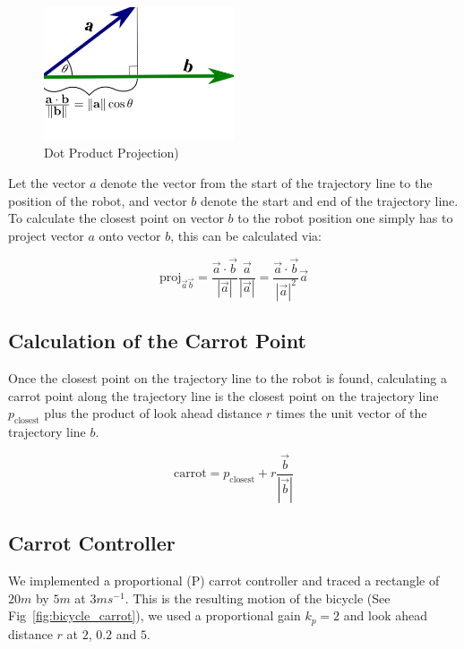 \documentclass{article}
\begin{document}
\begin{figure}[H]
	\centering
	\includegraphics[width=0.5\textwidth]{images/dot_product_projection.png}
	\caption{Dot Product Projection)}
	\label{fig:dot_product_projection}
\end{figure}

Let the vector $a$ denote the vector from the start of the trajectory line to the position of the robot, and vector $b$ denote the start and end of the trajectory line. To calculate the closest point on vector $b$ to the robot position one simply has to project vector $a$ onto vector $b$, this can be calculated via:

\begin{equation}
	\text{proj}_{\vec{a}\vec{b}} 
		= \dfrac{\vec{a} \cdot \vec{b}}{|\vec{a}|}
			\dfrac{\vec{a}}{|\vec{a}|} 
		= \dfrac{\vec{a} \cdot \vec{b}}{|\vec{a}|^{2}}
			\vec{a}
\end{equation}


\newpage
\subsection{Calculation of the Carrot Point}
Once the closest point on the trajectory line to the robot is found, calculating a carrot point along the trajectory line is the closest point on the trajectory line $p_{\text{closest}}$ plus the product of look ahead distance $r$ times the unit vector of the trajectory line $b$.

\begin{equation}
	\text{carrot} = p_{\text{closest}} + r \dfrac{\vec{b}}{|\vec{b}|}
\end{equation}



\subsection{Carrot Controller}
We implemented a proportional (P) carrot controller and traced a rectangle of $20m$ by $5m$ at $3ms^{-1}$. This is the resulting motion of the bicycle (See Fig~\ref{fig:bicycle_carrot}), we used a proportional gain $k_{p} = 2$ and look ahead distance $r$ at $2$, $0.2$ and $5$. 
\end{document}
